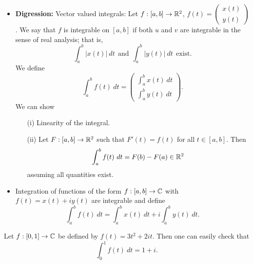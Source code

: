 \documentclass[a4paper]{article}
\begin{document}
\begin{itemize}
\item \textbf{Digression:} Vector valued integrals: 
    Let \( f: [a,b] \to \mathbb{R}^{2} \), \( f(t) = \begin{pmatrix} x(t) \\ y(t) \end{pmatrix}  \). We say that \( f \) is integrable on \( [a,b] \) if both \( u  \) and \( v  \) are integrable in the sense of real analysis; that is, 
    \[  \int_{ a }^{ b } | x(t) |  \ dt \ \ \text{and} \ \ \int_{ a }^{ b } | y(t) |  \ dt \ \ \text{exist}. \]
    We define 
    \[  \int_{ a }^{ b } f(t) \ dt = \begin{pmatrix} \int_{ a }^{ b }  x(t)  \ dt \\ \int_{ a }^{ b }  y(t)  \ dt  \end{pmatrix}. \]
    We can show 
    \begin{enumerate}
        \item[(i)] Linearity of the integral.
        \item[(ii)] Let \( F:[a,b] \to \mathbb{R}^{2} \) such that \( F'(t) = f(t) \) for all \( t \in [a,b] \). Then 
            \[  \int_{ a }^{ b } f(t) \ dt = F(b) - F(a) \in \mathbb{R}^{2} \]
            assuming all quantities exist.
    \end{enumerate}
\item Integration of functions of the form \( f: [a,b] \to \mathbb{C}  \) with \( f(t) = x(t) + i y(t) \) are integrable and define
    \[  \int_{ a }^{ b }  f(t) \ dt = \int_{ a }^{ b } x(t) \ dt + i \int_{ a }^{ b }  y(t) \ dt. \]
\end{itemize}

\begin{eg}
    Let \( f: [0,1] \to \mathbb{C}  \) be defined by \( f(t) = 3 t^{2} + 2i t \). Then one can easily check that  
    \[  \int_{ 0 }^{ 1 }  f(t) \ dt = 1 + i. \]
\end{eg}
\end{document}
